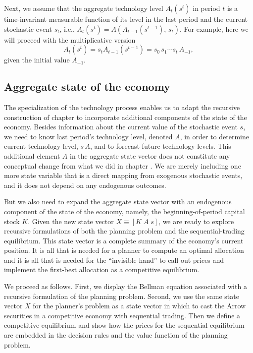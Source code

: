 Next, we assume that the aggregate technology level $A_t(s^t)$
in period $t$ is a time-invariant measurable function of its
level in the last period and the current stochastic event $s_t$,
i.e., $A_t(s^t) = A\left( A_{t-1}(s^{t-1}),\, s_t\right)$. For
example, here we will proceed with the multiplicative version
$$
A_t(s^t) = s_t A_{t-1}(s^{t-1}) =  s_0 \,s_1 \cdots s_t \, A_{-1},
$$
given the initial value $A_{-1}$.






\subsection{Aggregate state of the economy}
The specialization of the technology process enables us to
adapt the recursive construction of chapter  to incorporate
additional components of the state of the economy. Besides information
about the current value of the stochastic event $s$, we need to know
last period's technology level, denoted $A$, in order to determine
current technology level, $s\,A$, and to forecast future technology
levels. This additional element $A$ in the aggregate state vector
does not constitute any conceptual change from what we did in
chapter . We are merely including one more state
variable that is a direct mapping from exogenous stochastic events,
and it does not depend on any endogenous outcomes.


But we also need  to expand the aggregate state vector with
an endogenous component of the state of the economy, namely, the
beginning-of-period capital stock $K$. Given the new state
vector $X\equiv \left[ K \;  A \; s\right]$, we are ready to
explore recursive formulations of both the planning problem
and the sequential-trading equilibrium. This state vector is
a complete summary of the economy's current position. It is
all that is needed for a planner to compute an optimal
allocation and it is all that is needed for the ``invisible hand''
to call out prices and implement the first-best
allocation as a competitive equilibrium.


We proceed as follows. First, we display the Bellman equation
associated with a recursive formulation of the planning problem.  Second, we
use the
same state vector $X$
for the planner's problem as a state vector
in which to cast the Arrow securities in a competitive economy with sequential
trading.    Then we define a competitive equilibrium
and show how the prices for the sequential equilibrium are embedded in
the decision rules and the value function of the planning problem.




